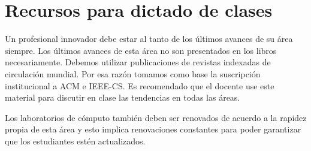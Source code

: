 \section{Recursos para dictado de clases}\label{sec:resources-to-teach}
Un profesional innovador debe estar al tanto de los últimos avances de su área siempre. 
Los últimos avances de esta área no son presentados en los libros necesariamente. 
Debemos utilizar publicaciones de revistas indexadas de circulación mundial. 
Por esa razón tomamos como base la suscripción institucional a ACM e IEEE-CS. 
Es recomendado que el docente use este material para discutir en clase las 
tendencias en todas las áreas.

Los laboratorios de cómputo también deben ser renovados de acuerdo a la rapidez 
propia de esta área y esto implica renovaciones constantes para poder garantizar 
que los estudiantes estén actualizados.
